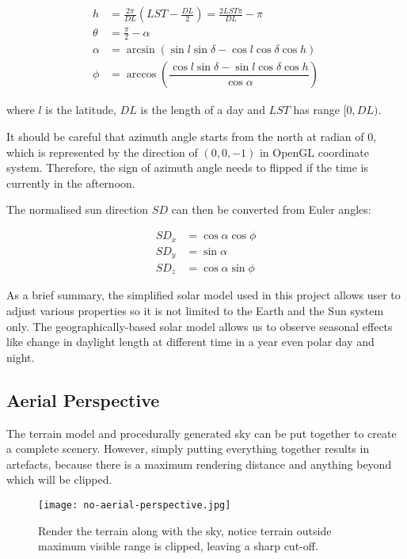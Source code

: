 \documentclass[oneside, a4paper]{report}
\begin{document}
    \begin{align}
        h &= \frac{2\pi}{DL} (LST - \frac{DL}{2}) = \frac{2LST \pi}{DL} - \pi \\
        \theta &= \frac{\pi}{2} - \alpha \\
        \alpha &= \arcsin{( \sin{l}\sin{\delta} - \cos{l}\cos{\delta}\cos{h} )} \\
        \phi &= \arccos{\left( \dfrac{\cos{l}\sin{\delta} - \sin{l}\cos{\delta}\cos{h}}{\cos{\alpha}} \right)}
    \end{align}

    where $l$ is the latitude, $DL$ is the length of a day and $LST$ has range \([0, DL)\).

    It should be careful that azimuth angle starts from the north at radian of 0, which is represented by the direction of \((0, 0, -1)\) in OpenGL coordinate system. Therefore, the sign of azimuth angle needs to flipped if the time is currently in the afternoon.

    The normalised sun direction \(SD\) can then be converted from Euler angles:

    \begin{align}
        SD_{x} &= \cos{\alpha}\cos{\phi} \\
        SD_{y} &= \sin{\alpha} \\
        SD_{z} &= \cos{\alpha}\sin{\phi}
    \end{align}

    As a brief summary, the simplified solar model used in this project allows user to adjust various properties so it is not limited to the Earth and the Sun system only. The geographically-based solar model allows us to observe seasonal effects like change in daylight length at different time in a year even polar day and night.

    \subsection{Aerial Perspective}

    The terrain model and procedurally generated sky can be put together to create a complete scenery. However, simply putting everything together results in artefacts, because there is a maximum rendering distance and anything beyond which will be clipped.

    \begin{figure}[H]
        \texttt{[image: no-aerial-perspective.jpg]}
        \caption{Render the terrain along with the sky, notice terrain outside maximum visible range is clipped, leaving a sharp cut-off.}
        \label{no_aerial_perspective}
    \end{figure}
\end{document}
